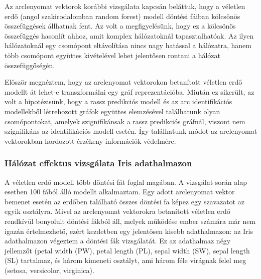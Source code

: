 Az arclenyomat vektorok korábbi vizsgálata kapcsán beláttuk, hogy a véletlen erdő (angol szakirodalomban random forest) modell döntési fáiban kölcsönös összefüggések állhatnak fent. Az volt a megfigyelésünk, hogy ez a kölcsönös összefüggés hasonlít ahhoz, amit komplex hálózatoknál tapasztalhatóak. Az ilyen hálózatoknál egy csomópont eltávolítása nincs nagy hatással a hálózatra, hanem több csomópont együttes kivételével lehet jelentősen rontani a hálózat összefüggőségén. 

Először megnéztem, hogy az arclenyomat vektorokon betanított véletlen erdő modellt át lehet-e transzformálni egy gráf reprezentációba. Miután ez sikerült, az volt a hipotézisünk, hogy a rassz predikciós modell és az arc identifikációs modellekből létrehozott gráfok együttes elemzésével találhatunk olyan csomópontokat, amelyek szignifikánsak a rassz predikciós gráfnál, viszont nem szignifikáns az identifikációs modell esetén. Így találhatunk módot az arclenyomat vektorokban hordozott érzékeny információk védelmére. 

\subsubsection*{Hálózat effektus vizsgálata Iris adathalmazon}
A véletlen erdő modell több döntési fát foglal magában. A vizsgálat során alap esetben 100 fából álló modellt alkalmaztam. Egy adott arclenyomat vektor bemenet esetén az erdőben található összes döntési fa képez egy szavazatot az egyik osztályra. Mivel az arclenyomat vektorokra betanított véletlen erdő rendkívül bonyolult döntési fákból áll, melyek működése ember számára már nem igazán értelmezhető, ezért kezdetben egy jelentősen kisebb adathalmazon: az Iris adathalmazon \cite{iris1936} végeztem a döntési fák vizsgálatát. Ez az adathalmaz négy jellemzőt (petal width (PW), petal length (PL), sepal width (SW), sepal length (SL) tartalmaz, és három kimeneti osztályt, ami három féle virágnak felel meg (setosa, versicolor, virginica). 

